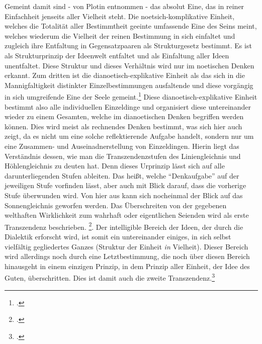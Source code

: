 Gemeint damit sind - von Plotin entnommen - das absolut Eine, das in reiner Einfachheit jenseits aller Vielheit steht. Die noetsich-komplikative Einheit, welches die Totalität aller Bestimmtheit geeinte umfassende Eine des Seins meint, welches wiederum die Vielheit der reinen Bestimmung in sich einfaltet und zugleich ihre Entfaltung in Gegensatzpaaren als Strukturgesetz bestimmt. Es ist als Strukturprinzip der Ideenwelt entfaltet und als Einfaltung aller Ideen unentfaltet. Diese Struktur und dieses Verhältnis wird nur im noetischen Denken erkannt. Zum dritten ist die dianoetisch-explikative Einheit als das sich in die Mannigfaltigkeit distinkter Einzelbestimmungen ausfaltende und diese vorgängig in sich umgreifende Eine der Seele gemeint.\footcite[vgl.][S. 190]{halfwassenaufstieg2006} Diese dianoetisch-explikative Einheit bestimmt also alle individuellen Einzeldinge und organisiert diese untereinander wieder zu einem Gesamten, welche im dianoetischen Denken begriffen werden können. Dies wird meist als rechnendes Denken bestimmt, was sich hier auch zeigt, da es nicht um eine solche reflektierende Aufgabe handelt, sondern nur um eine Zusammen- und Auseinadnerstellung von Einzeldingen.
Hierin liegt das Verständnis dessen, wie man die Transzendenzstufen des Liniengleichnis und Höhlengleichnis zu deuten hat. Denn dieses Urprinzip lässt sich auf alle darunterliegenden Stufen ableiten. Das heißt, welche \enquote{Denkaufgabe} auf der jeweiligen Stufe vorfinden lässt, aber auch mit Blick darauf, dass die vorherige Stufe überwunden wird.
Von hier aus kann sich nocheinmal der Blick auf das Sonnengleichnis geworfen werden.
Das Überschreiten von der gegebenen welthaften Wirklichkeit zum wahrhaft oder eigentlichen Seienden wird als erste Transzendenz beschrieben. \footcite[vgl.][S. 222]{halfwassenaufstieg2006}.
Der intelligible Bereich der Ideen, der durch die Dialektik erforscht wird, ist somit ein untereinander einiges, in sich selbst vielfältig gegliedertes Ganzes (Struktur der Einheit \emph{in} Vielheit). Dieser Bereich wird allerdings noch durch eine Letztbestimmung, die noch über diesen Bereich hinausgeht in einem einzigen Prinzip, in dem Prinzip aller Einheit, der Idee des Guten, überschritten. Dies ist damit auch die zweite Transzendenz.\footcite[vgl.][S. 223f.]{halfwassenaufstieg2006}
